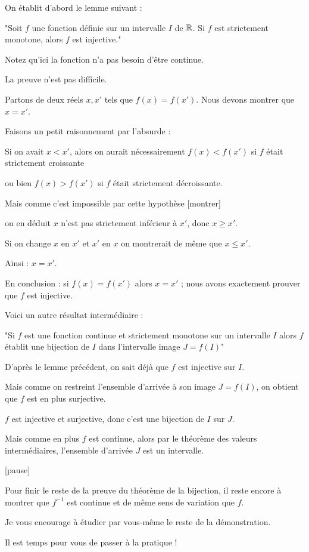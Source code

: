 On établit d'abord le lemme suivant :

"Soit $f$ une fonction définie sur un intervalle $I$ de $\mathbb{R}$. Si $f$ est 
strictement monotone, alors $f$ est injective."

Notez qu'ici la fonction n'a pas besoin d'être continue.


\change

La preuve n'est pas difficile.

Partons de deux réels $x,x'$ tels que $f(x)=f(x')$. Nous devons montrer que $x=x'$. 

\change
Faisons un petit raisonnement par l'absurde :

Si on avait $x<x'$, 
alors on aurait nécessairement $f(x)<f(x')$ si $f$ était strictement croissante

ou bien $f(x)>f(x')$ si $f$ était strictement décroissante.

Mais comme c'est impossible par cette hypothèse [montrer] 

on en déduit $x$ n'est pas strictement inférieur à $x'$, donc $x\geq x'$.

\change

Si on change $x$ en $x'$ et $x'$ en $x$
on montrerait de même que $x\leq x'$. 


\change

Ainsi  :  $x=x'$.

En conclusion : si $f(x)=f(x')$ alors $x=x'$ ;
nous avons exactement prouver que $f$ est injective.



\diapo


Voici un autre résultat intermédiaire : 

"Si $f$ est une fonction continue 
et strictement monotone sur un intervalle $I$ alors
$f$ établit une bijection de $I$ dans l'intervalle image $J=f(I)$"  

\change
D'après le lemme précédent, on sait déjà que $f$ est injective sur $I$.

\change

Mais comme on restreint l'ensemble d'arrivée à son image $J=f(I)$, on obtient que 
$f$ est en plus surjective. 


\change

$f$ est injective et surjective, donc c'est une bijection de $I$ sur $J$.

\change

Mais comme en plus $f$ est continue,
alors par le théorème des valeurs intermédiaires,
l'ensemble d'arrivée $J$ est un intervalle.

[pause]

Pour finir le reste de la preuve du théorème de la bijection, il reste
encore à montrer que $f^{-1}$ est continue et de même sens de variation que $f$.

Je vous encourage à étudier par vous-même le reste de la démonstration.



\diapo

Il est temps pour vous de passer à la pratique !


